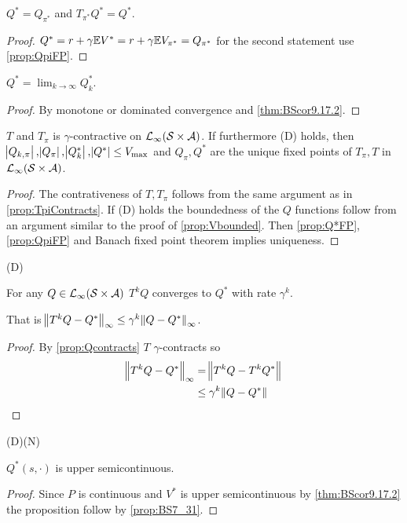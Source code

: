 \begin{prop}
  $Q^* = Q_{\pi^*}$ and
  $T_{\pi^*} Q^* = Q^*$.
  \label{prop:Q*=Qpi*}
\end{prop}
\begin{proof}
  $Q^* = r + \gamma \mathbb{E} V^* = r + \gamma \mathbb{E} V_{\pi^*} = Q_{\pi^*}$
  for the second statement use \cref{prop:QpiFP}.
\end{proof}

\begin{prop}
  $Q^* = \lim_{k\to\infty} Q_k^*$.
\end{prop}
\begin{proof}
  By monotone or dominated convergence and \cref{thm:BScor9.17.2}.
\end{proof}

\begin{prop}
  $T$ and $T_\pi$ is $\gamma$-contractive on
  $\mathcal{L}_\infty(\mathcal{S}\times\mathcal{A})$.
  If furthermore (D) holds, then
  $\abs{Q_{k, \pi}}, \abs{Q_\pi}, \abs{Q^*_k}, \abs{Q^*} \leq V_{\max}$
  and $Q_\pi, Q^*$ are the unique fixed points of $T_\pi, T$ in 
  $\mathcal{L}_\infty(\mathcal{S}\times\mathcal{A})$.
  \label{prop:Qcontracts}
\end{prop}

\begin{proof}
  The contrativeness of $T,T_\pi$ follows from the same argument as in
  \cref{prop:TpiContracts}. If (D) holds
  the boundedness of the $Q$ functions
  follow from an argument similar to the proof of \cref{prop:Vbounded}.
  Then \cref{prop:Q*FP}, \cref{prop:QpiFP} and Banach fixed point theorem
  implies uniqueness.
\end{proof}

\begin{prop}(D)

  For any $Q \in \mathcal{L}_\infty(\mathcal{S} \times \mathcal{A})$
  $T^k Q$ converges to $Q^*$ with rate $\gamma^k$.

  That is
  $\norm{T^k Q - Q^*}_\infty \leq \gamma^k \norm{Q - Q^*}_\infty$.
  \label{prop:Qrate}
\end{prop}
\begin{proof} 
  By \cref{prop:Qcontracts} $T$ $\gamma$-contracts so
  \begin{align*}
    \norm{T^k Q - Q^*}_\infty &= \norm{T^k Q - T^k Q^*}
    \\ &\leq \gamma^k \norm{Q - Q^*}
  \end{align*}
\end{proof}

\begin{prop}(D)(N)

  $Q^*(s, \cdot)$ is upper semicontinuous.
\end{prop}
\begin{proof}
  Since $P$ is continuous and $V^*$ is upper semicontinuous by
  \cref{thm:BScor9.17.2} the proposition follow by
  \cref{prop:BS7_31}.
\end{proof}

